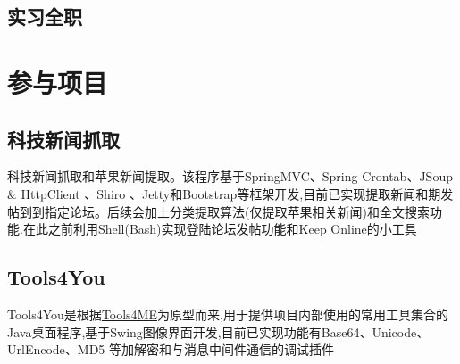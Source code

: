 \documentclass[11pt,a4paper,kai]{moderncv}   %
\begin{document}
\begin{CJK}{UTF8}{kai}
\subsection{实习全职}

\section{参与项目}
\subsection{科技新闻抓取}
科技新闻抓取和苹果新闻提取。该程序基于SpringMVC、Spring Crontab、JSoup \& HttpClient 、Shiro 、Jetty和Bootstrap等框架开发,目前已实现提取新闻和期发帖到到指定论坛。后续会加上分类提取算法(仅提取苹果相关新闻)和全文搜索功能.在此之前利用Shell(Bash)实现登陆论坛发帖功能和Keep Online的小工具
\subsection{Tools4You}
 Tools4You是根据\href{https://github.com/Mailerm/Tools4ME}{Tools4ME}为原型而来,用于提供项目内部使用的常用工具集合的Java桌面程序,基于Swing图像界面开发,目前已实现功能有Base64、Unicode、UrlEncode、MD5 等加解密和与消息中间件通信的调试插件

\end{CJK}
\end{document}
